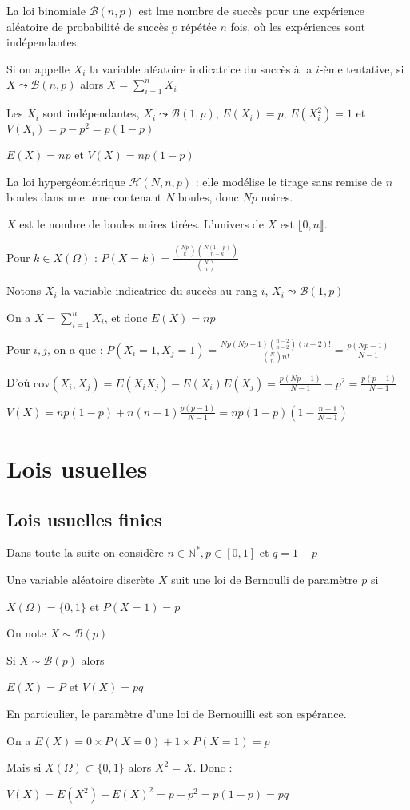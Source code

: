\documentclass[a4paper,12pt]{book}
\newcommand{\Def}[2]{\begin{tcolorbox}[sharp corners, colback=white,colframe=blue!90!black!75, title=Définition : #1]#2\end{tcolorbox}}
\newcommand{\Prop}[2]{\begin{tcolorbox}[sharp corners, colback=white,colframe=red!90!black!75, title=Proposition : #1]#2\end{tcolorbox}}
\newcommand{\Pre}[1]{\begin{tcolorbox}[sharp corners, colback=white,colframe=green!60!green!30!black!75, title=Preuve]#1\end{tcolorbox}}
\def\N{\mathbb{N}}
\begin{document}
La loi binomiale $\mathcal{B}(n,p)$ est lme nombre de succès pour une expérience aléatoire de probabilité de succès $p$ répétée $n$ fois, où les expériences sont indépendantes.
\par Si on appelle $X_i$ la variable aléatoire indicatrice du succès à la $i$-ème tentative, si $X\leadsto \mathcal{B}(n,p)$ alors $X=\sum\limits_{i=1}^n X_i$
\par Les $X_i$ sont indépendantes, $X_i\leadsto \mathcal{B}(1,p)$, $E(X_i) = p$, $E(X_i^2)=1$ et $V(X_i) = p - p^2 = p(1-p)$
\par $E(X) = np$ et $V(X)=np(1-p)$
\par La loi hypergéométrique $\mathcal{H}(N, n, p)$ : elle modélise le tirage sans remise de $n$ boules dans une urne contenant $N$ boules, donc $Np$ noires.
\par $X$ est le nombre de boules noires tirées. L'univers de $X$ est $\llbracket 0, n\rrbracket$.
\par Pour $k\in X(\Omega)$ : $P(X=k) = \frac{\binom{Np}{k}\binom{N(1-p)}{n-k}}{\binom{N}{n}}$
\par Notons $X_i$ la variable indicatrice du succès au rang $i$, $X_i\leadsto \mathcal{B}(1,p)$
\par On a $X=\sum\limits_{i=1}^n X_i$, et donc $E(X) = np$
\par Pour $i,j$, on a que : $P(X_i=1, X_j=1) = \frac{Np(Np-1)\binom{n-2}{n-2}(n-2)!}{\binom{N}{n}n!} = \frac{p(Np-1)}{N-1}$
\par D'où $\mathrm{cov}(X_i, X_j) = E(X_iX_j) - E(X_i)E(X_j) = \frac{p(Np-1)}{N-1} - p^2 = \frac{p(p-1)}{N-1}$
\par $V(X) = np(1-p) + n(n-1)\frac{p(p-1)}{N-1} = np(1-p)\left(1-\frac{n-1}{N-1}\right)$


\section{Lois usuelles}
\subsection{Lois usuelles finies}
Dans toute la suite on considère $n\in\N^*, p\in[0,1]$ et $q=1-p$
\Def{}{Une variable aléatoire discrète $X$ suit une loi de Bernoulli de paramètre $p$ si
\par\begin{center}$X(\Omega)=\{0,1\}$ et $P(X=1)=p$\end{center}
\par On note $X\sim\mathcal{B}(p)$}
\Prop{}{Si $X\sim\mathcal{B}(p)$ alors
\par\begin{center}$E(X)=P$ et $V(X)=pq$\end{center}
En particulier, le paramètre d'une loi de Bernouilli est son espérance.}
\Pre{On a $E(X) = 0 \times P(X=0) + 1\times P(X=1) = p$
\par Mais si $X(\Omega)\subset\{0,1\}$ alors $X^2=X$. Donc :
\par $V(X)=E(X^2)-E(X)^2= p - p^2 = p(1-p)=pq$}
\end{document}
